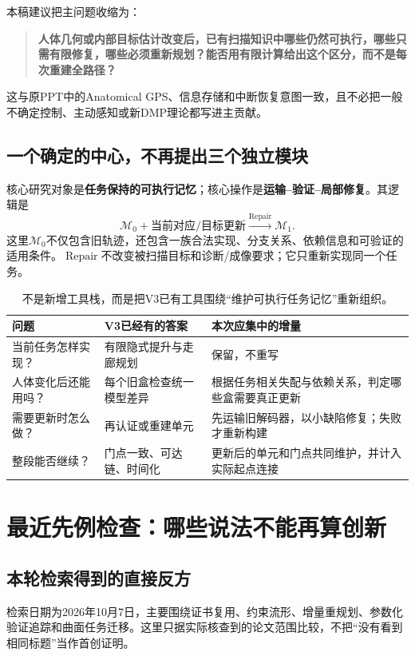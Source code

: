 \documentclass[UTF8,11pt,a4paper,fontset=fandol]{ctexart}
\numberwithin{equation}{section}
\theoremstyle{definition}
\DeclareMathOperator{\Repair}{Repair}
\begin{document}
本稿建议把主问题收缩为：
\begin{quote}
\textbf{人体几何或内部目标估计改变后，已有扫描知识中哪些仍然可执行，哪些只需有限修复，哪些必须重新规划？能否用有限计算给出这个区分，而不是每次重建全路径？}
\end{quote}
这与原PPT中的Anatomical GPS、信息存储和中断恢复意图一致\cite{ppt}，且不必把一般不确定控制、主动感知或新DMP理论都写进主贡献。

\subsection{一个确定的中心，不再提出三个独立模块}
核心研究对象是\textbf{任务保持的可执行记忆}；核心操作是\textbf{运输--验证--局部修复}。其逻辑是
\begin{equation}
\boxed{
\mathscr M_0+\text{当前对应/目标更新}
\xrightarrow{\Repair}
\mathscr M_1.
}
\end{equation}
这里$\mathscr M_0$不仅包含旧轨迹，还包含一族合法实现、分支关系、依赖信息和可验证的适用条件。$\Repair$不改变被扫描目标和诊断/成像要求；它只重新实现同一个任务。

\begin{table}[H]\centering\small
\begin{tabularx}{\textwidth}{p{}YY}\toprule
问题 & V3已经有的答案 & 本次应集中的增量\\\midrule
当前任务怎样实现？ & 有限隐式提升与走廊规划 & 保留，不重写\\
人体变化后还能用吗？ & 每个旧盒检查统一模型差异 & 根据任务相关失配与依赖关系，判定哪些盒需要真正更新\\
需要更新时怎么做？ & 再认证或重建单元 & 先运输旧解码器，以小缺陷修复；失败才重新构建\\
整段能否继续？ & 门点一致、可达链、时间化 & 更新后的单元和门点共同维护，并计入实际起点连接\\\bottomrule
\end{tabularx}
\caption{不是新增工具栈，而是把V3已有工具围绕“维护可执行任务记忆”重新组织。}
\end{table}

\section{最近先例检查：哪些说法不能再算创新}
\subsection{本轮检索得到的直接反方}
检索日期为2026年10月7日，主要围绕证书复用、约束流形、增量重规划、参数化验证追踪和曲面任务迁移。这里只据实际核查到的论文范围比较，不把“没有看到相同标题”当作首创证明。
\end{document}
